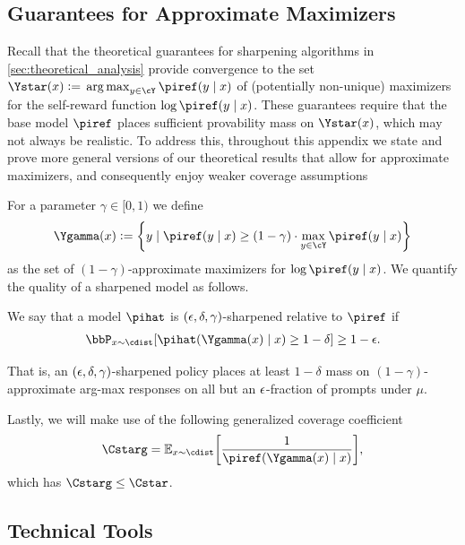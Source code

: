 

\subsection{Guarantees for Approximate Maximizers}
\label{sec:approx}

Recall that the theoretical guarantees for sharpening algorithms in \cref{sec:theoretical_analysis} provide convergence to the set $\Ystar(x)\ldef{}\argmax_{y\in\cY}\piref(y\mid{}x)$ of
(potentially non-unique) maximizers for the \mlsharp self-reward
function $\log\piref(y\mid{}x)$. These guarantees require that the
base model $\piref$ places sufficient provability mass on $\Ystar(x)$,
which may not always be realistic. To address this, throughout this appendix we state and prove more general versions of our theoretical results that allow for approximate maximizers, and consequently enjoy weaker coverage assumptions

For a parameter $\gamma\in[0,1)$ we define
\begin{align}
  \Ygamma(x)\ldef{}\crl*{y\mid{}
  \piref(y\mid{}x)\geq{}(1-\gamma)\cdot\max_{y\in\cY}\piref(y\mid
  x)}
\end{align}%
as the set of $(1-\gamma)$-approximate maximizers for $\log\piref(y\mid{}x)$.
We quantify the
quality of a
sharpened model
as follows.
\begin{definition}
  \label{def:sharpening_general}
    We say that a model $\pihat$ is $(\epsilon,\delta,\gamma)$-sharpened relative
    to $\piref$ if
    \begin{align}
      \bbP_{x\sim\cdist}\brk*{\pihat\prn*{\Ygamma(x)\mid{}x}\geq{}1-\delta} \geq{} 1-\eps.
    \end{align}
  \end{definition}
That is, an 
$(\epsilon,\delta,\gamma)$-sharpened policy places at least
$1-\delta$ mass on $(1-\gamma)$-approximate arg-max responses on all but an $\epsilon$-fraction
of prompts under $\mu$.

Lastly, we will make use of the following generalized coverage coefficient
\begin{align}
  \Cstarg = \En_{x\sim\cdist}\brk*{\frac{1}{\piref(\Ygamma(x)\mid{}x)}},
\end{align}
which has $\Cstarg\leq{}\Cstar$.

\subsection{Technical Tools}


